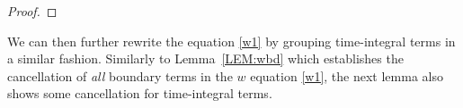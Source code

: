 \documentclass[%
11pt,  reqno]{amsart}
\makeatletter
\newcommand{\5}{\textup{V}}
\newcommand{\wt}{\widetilde}
\theoremstyle{remark}
\newcommand{\bul}{\bullet}
\newcommand{\TT}{\mathcal{T}}
\newcommand{\Tr}{\mathrm{T}}
\newcommand{\ff}{\mathfrak{f}}
\def\<#1>{\csname MH@symb@#1\endcsname}
\numberwithin{equation}{section}
\numberwithin{theorem}{section}
\newcommand{\BB}{\mathrm{B}}
\newcommand{\D}{\mathrm{D}}
\makeatother
\begin{document}
\begin{proof}





\end{proof}



We can then further rewrite the equation \eqref{w1} by grouping time-integral terms in a similar fashion. Similarly to Lemma~\ref{LEM:wbd} which establishes the cancellation of \textit{all} boundary terms in the $w$ equation \eqref{w1}, the next lemma also shows some cancellation for time-integral terms. 
\end{document}

